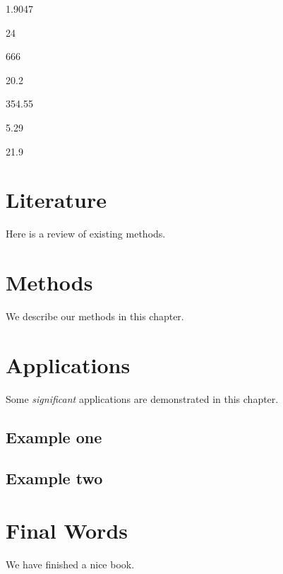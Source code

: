 \documentclass[]{book}
\begin{document}
1.9047

24

666

20.2

354.55

5.29

21.9

\hypertarget{literature}{%
\chapter{Literature}\label{literature}}

Here is a review of existing methods.

\hypertarget{methods}{%
\chapter{Methods}\label{methods}}

We describe our methods in this chapter.

\hypertarget{applications}{%
\chapter{Applications}\label{applications}}

Some \emph{significant} applications are demonstrated in this chapter.

\hypertarget{example-one}{%
\section{Example one}\label{example-one}}

\hypertarget{example-two}{%
\section{Example two}\label{example-two}}

\hypertarget{final-words}{%
\chapter{Final Words}\label{final-words}}

We have finished a nice book.


\end{document}
